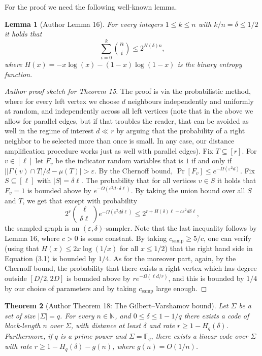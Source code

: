 \documentclass[10pt,a4paper]{article}
\newtheorem{nttheorem}{Theorem}
\newtheorem{ntlemma}[nttheorem]{Lemma}
\begin{document}
For the proof we need the following well-known lemma.
\begin{ntlemma}[Author Lemma 16]
For every integers $1\leq k\leq n$ with $k/n=\delta\leq1/2$ it holds that
\[\sum_{i=0}^k\binom ni\leq2^{H(\delta)n},\]
where $H(x)=-x\log(x)-(1-x)\log(1-x)$ is the binary entropy function.
\end{ntlemma}
\begin{proof}[Author proof sketch for Theorem 15]
The proof is via the probabilistic method, where for every left vertex we choose $d$ neighbours independently and uniformly at random, and independently across all left vertices (note that in the above we allow for parallel edges, but if that troubles the reader, that can be avoided as well in the regime of interest $d\ll r$ by arguing that the probability of a right neighbor to be selected more than once is small. In any case, our distance amplification procedure works just as well with parallel edges). Fix $T\subseteq[r]$. For $v\in[\ell]$ let $F_v$ be the indicator random variables that is $1$ if and only if $\bigl||\Gamma(v)\cap T|/d-\mu(T)\bigr|>\varepsilon$. By the Chernoff bound, $\Pr[F_v]\leq e^{-\Omega(\varepsilon^2d)}$. Fix $S\subseteq[\ell]$ with $|S|=\delta\ell$. The probability that for all vertices $v\in S$ it holds that $F_v=1$ is bounded above by $e^{-\Omega(\varepsilon^2d\cdot\delta\ell)}$. By taking the union bound over all $S$ and $T$, we get that except with probability
\begin{equation}2^r\binom\ell{\delta\ell}e^{-\Omega(\varepsilon^2d\delta\ell)}\leq2^{r+H(\delta)\ell-c\varepsilon^2d\delta\ell},\tag{3.1}\end{equation}
the sampled graph is an $(\varepsilon,\delta)$-sampler. Note that the last inequality follows by Lemma 16, where $c>0$ is some constant. By taking $c_{\mathrm{samp}}\geq5/c$, one can verify (using that $H(x)\leq2x\log(1/x)$ for all $x\leq1/2$) that the right hand side in Equation (3.1) is bounded by $1/4$.
As for the moreover part, again, by the Chernoff bound, the probability that there exists a right vertex which has degree outside $[D/2,2D]$ is bounded above by $re^{-\Omega(\ell d/r)}$, and this is bounded by $1/4$ by our choice of parameters and by taking $c_{\mathrm{samp}}$ large enough.
\end{proof}
\setcounter{nttheorem}{17}
\begin{nttheorem}[Author Theorem 18: The Gilbert--Varshamov bound]
Let $\Sigma$ be a set of size $|\Sigma|=q$. For every $n\in\mathbb N$, and $0\leq\delta\leq1-1/q$ there exists a code of block-length $n$ over $\Sigma$, with distance at least $\delta$ and rate $r\geq1-H_q(\delta)$. Furthermore, if $q$ is a prime power and $\Sigma=\mathbb F_q$, there exists a linear code over $\Sigma$ with rate $r\geq1-H_q(\delta)-g(n)$, where $g(n)=O(1/n)$.
\end{nttheorem}
\end{document}
